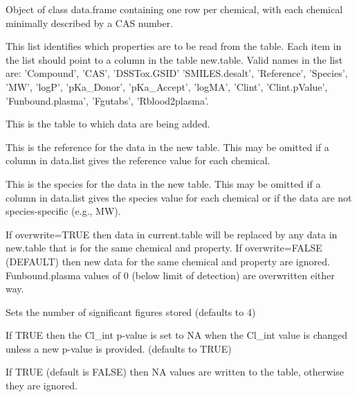 \documentclass[a4paper]{book}
\begin{document}
\begin{Arguments}
\begin{ldescription}
\item[\code{new.table}] Object of class data.frame containing one row per chemical,
with each chemical minimally described by a CAS number.

\item[\code{data.list}] This list identifies which properties are to be read from
the table. Each item in the list should point to a column in the table
new.table. Valid names in the list are: 'Compound', 'CAS', 'DSSTox.GSID'
'SMILES.desalt', 'Reference', 'Species', 'MW', 'logP', 'pKa\_Donor',
'pKa\_Accept', 'logMA', 'Clint', 'Clint.pValue', 'Funbound.plasma',
'Fgutabs', 'Rblood2plasma'.

\item[\code{current.table}] This is the table to which data are being added.

\item[\code{reference}] This is the reference for the data in the new table. This
may be omitted if a column in data.list gives the reference value for each
chemical.

\item[\code{species}] This is the species for the data in the new table. This may
be omitted if a column in data.list gives the species value for each
chemical or if the data are not species-specific (e.g., MW).

\item[\code{overwrite}] If overwrite=TRUE then data in current.table will be
replaced by any data in new.table that is for the same chemical and
property. If overwrite=FALSE (DEFAULT) then new data for the same chemical
and property are ignored.  Funbound.plasma values of 0 (below limit of
detection) are overwritten either way.

\item[\code{sig.fig}] Sets the number of significant figures stored (defaults to 4)

\item[\code{clint.pvalue.overwrite}] If TRUE then the Cl\_int p-value is set to NA 
when the Cl\_int value is changed unless a new p-value is provided. (defaults
to TRUE)

\item[\code{allow.na}] If TRUE (default is FALSE) then NA values are written to the
table, otherwise they are ignored.
\end{ldescription}
\end{Arguments}
\end{document}
